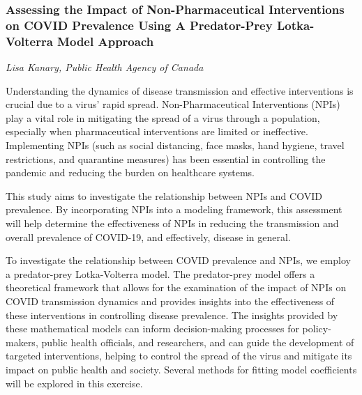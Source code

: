 \subsubsection*{Assessing the Impact of Non-Pharmaceutical Interventions on COVID Prevalence Using A Predator-Prey Lotka-Volterra Model Approach}
\textit{Lisa Kanary, Public Health Agency of Canada}

Understanding the dynamics of disease transmission and effective
interventions is crucial due to a virus' rapid
spread. Non-Pharmaceutical Interventions (NPIs) play a vital role in
mitigating the spread of a virus through a population, especially when
pharmaceutical interventions are limited or ineffective.  Implementing
NPIs (such as social distancing, face masks, hand hygiene, travel
restrictions, and quarantine measures) has been essential in
controlling the pandemic and reducing the burden on healthcare
systems.

This study aims to investigate the relationship between NPIs and COVID
prevalence. By incorporating NPIs into a modeling framework, this
assessment will help determine the effectiveness of NPIs in reducing
the transmission and overall prevalence of COVID-19, and effectively,
disease in general.

To investigate the relationship between COVID prevalence and NPIs, we
employ a predator-prey Lotka-Volterra model. The predator-prey model
offers a theoretical framework that allows for the examination of the
impact of NPIs on COVID transmission dynamics and provides insights
into the effectiveness of these interventions in controlling disease
prevalence. The insights provided by these mathematical models can
inform decision-making processes for policy-makers, public health
officials, and researchers, and can guide the development of targeted
interventions, helping to control the spread of the virus and mitigate
its impact on public health and society. Several methods for fitting
model coefficients will be explored in this exercise.

